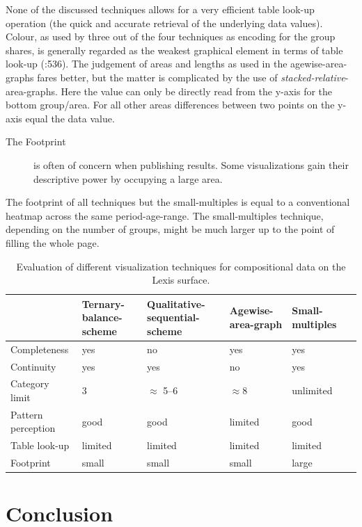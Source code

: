 \documentclass{scrartcl}
\begin{document}
None of the discussed techniques allows for a very efficient table look-up operation (the quick and accurate retrieval of the underlying data values). Colour, as used by three out of the four techniques as encoding for the group shares, is generally regarded as the weakest graphical element in terms of table look-up (\cite{Cleveland1984}:536). The judgement of areas and lengths as used in the agewise-area-graphs fares better, but the matter is complicated by the use of \emph{stacked-relative}-area-graphs. Here the value can only be directly read from the y-axis for the bottom group/area. For all other areas differences between two points on the y-axis equal the data value.

\begin{description}
  \item[The Footprint] is often of concern when publishing results. Some visualizations gain their descriptive power by occupying a large area.
\end{description}

The footprint of all techniques but the small-multiples is equal to a conventional heatmap across the same period-age-range. The small-multiples technique, depending on the number of groups, might be much larger up to the point of filling the whole page.

\begin{table}[!htb]
\tabformat
\begin{tabular}{p{3.5cm}*5{Q{1.5cm}}}
\toprule
 & Ternary-balance-scheme & Qualitative-sequential-scheme & Agewise-area-graph & Small-multiples \\
\midrule
Completeness & yes & no & yes & yes \\
Continuity & yes & yes & no & yes \\
Category limit & 3 & $\approx$ 5--6 & $\approx 8$ & unlimited \\
Pattern perception & good & good & limited & good \\
Table look-up & limited & limited & limited & limited \\
Footprint & small & small & small & large \\
\bottomrule
\end{tabular}
\caption{Evaluation of different visualization techniques for compositional data on the Lexis surface.}
\label{tab:eval}
\end{table}

\clearpage

\section{Conclusion} %
\label{sec:con}
\end{document}
